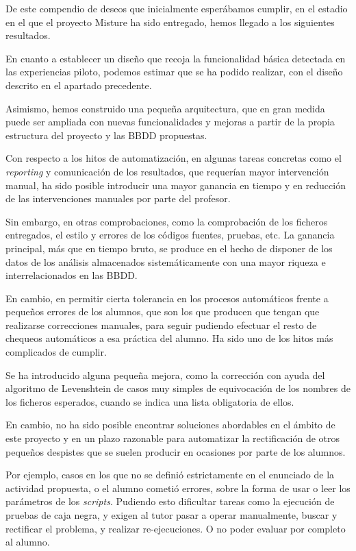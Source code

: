 De este compendio de deseos que inicialmente esperábamos cumplir, en el estadio en el que el proyecto Misture ha sido entregado, hemos llegado a los siguientes resultados.\


En cuanto a establecer un diseño que recoja la funcionalidad básica detectada en las experiencias piloto, podemos estimar que se ha podido realizar, con el diseño descrito en el apartado precedente.


Asimismo, hemos construido una pequeña arquitectura, que en gran medida puede ser ampliada con nuevas funcionalidades y mejoras a partir de la propia estructura del proyecto y las BBDD propuestas.


Con respecto a los hitos de automatización, en algunas tareas concretas como el \textit{reporting} y comunicación de los resultados, que requerían mayor intervención manual, ha sido posible introducir una mayor ganancia en tiempo y en reducción de las intervenciones manuales por parte del profesor.


Sin embargo, en otras comprobaciones, como la comprobación de los ficheros entregados, el estilo y errores de los códigos fuentes, pruebas, etc. La ganancia principal, más que en tiempo bruto, se produce en el hecho de disponer de los datos de los análisis almacenados sistemáticamente con una mayor riqueza e interrelacionados en las BBDD.


En cambio, en permitir cierta tolerancia en los procesos automáticos frente a pequeños errores de los alumnos, que son los que producen que tengan que realizarse correcciones manuales, para seguir pudiendo efectuar el resto de chequeos automáticos a esa práctica del alumno. Ha sido uno de los hitos más complicados de cumplir.


Se ha introducido alguna pequeña mejora, como la corrección con ayuda del algoritmo de Levenshtein de casos muy simples de equivocación de los nombres de los ficheros esperados, cuando se indica una lista obligatoria de ellos.


En cambio, no ha sido posible encontrar soluciones abordables en el ámbito de este proyecto y en un plazo razonable para automatizar la rectificación de otros pequeños despistes que se suelen producir en ocasiones por parte de los alumnos.


Por ejemplo, casos en los que no se definió estrictamente en el enunciado de la actividad propuesta, o el alumno cometió errores, sobre la forma de usar o leer los parámetros de los \textit{scripts}. Pudiendo esto dificultar tareas como la ejecución de pruebas de caja negra, y exigen al tutor pasar a operar manualmente, buscar y rectificar el problema, y realizar re-ejecuciones. O no poder evaluar por completo al alumno.


